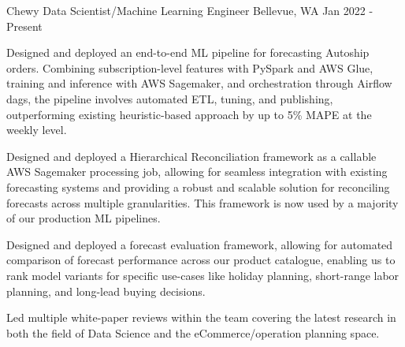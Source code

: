 \begin{cventries}
  \cveducationentry
    {Chewy} %
    {Data Scientist/Machine Learning Engineer} %
    {Bellevue, WA} %
    {Jan 2022 - Present} %
    {
      \begin{cvitems}
        \item {Designed and deployed an end-to-end ML pipeline for forecasting Autoship orders. Combining subscription-level features with PySpark and AWS Glue, training and inference with AWS Sagemaker, and orchestration through Airflow dags, the pipeline involves automated ETL, tuning, and publishing, outperforming existing heuristic-based approach by up to 5\% MAPE at the weekly level.}
        \item {Designed and deployed a Hierarchical Reconciliation framework as a callable AWS Sagemaker processing job, allowing for seamless integration with existing forecasting systems and providing a robust and scalable solution for reconciling forecasts across multiple granularities. This framework is now used by a majority of our production ML pipelines.}        
        \item {Designed and deployed a forecast evaluation framework, allowing for automated comparison of forecast performance across our product catalogue, enabling us to rank model variants for specific use-cases like holiday planning, short-range labor planning, and long-lead buying decisions.}
        \item {Led multiple white-paper reviews within the team covering the latest research in both the field of Data Science and the eCommerce/operation planning space.}
      \end{cvitems}
    }


\end{cventries}
